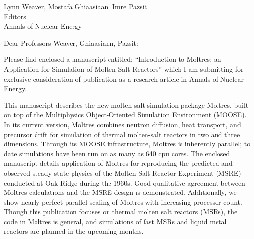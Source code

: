 \documentclass[10pt]{letter} %
\begin{document}

\begin{letter}{Lynn Weaver, Mostafa Ghiaasiaan, Imre Pazsit\\
Editors\\
Annals of Nuclear Energy}


\address{Department of Nuclear, Plasma, and Radiological Engineering\\
Talbot Hall, Room 226\\
104 S Wright St\\
University of Illinois, Urbana-Champaign\\
Urbana, IL 61801}



\opening{Dear Professors Weaver, Ghiaasiann, Pazsit:}

Please find enclosed a manuscript entitled: ``Introduction to Moltres: an
Application for Simulation of Molten Salt Reactors'' which I am submitting for
exclusive consideration of publication as a research article in Annals of
Nuclear Energy.

This manuscript describes the new molten salt simulation package Moltres, built
on top of the Multiphysics Object-Oriented Simulation Environment (MOOSE). In
its current version, Moltres combines neutron diffusion, heat transport, and
precursor drift for simulation of thermal molten-salt reactors in two and three
dimensions. Through its MOOSE infrastructure, Moltres is inherently parallel; to
date simulations have been run on as many as 640 cpu cores. The enclosed
manuscript details application of Moltres for reproducing the predicted and
observed steady-state physics of the Molten Salt Reactor Experiment (MSRE)
conducted at Oak Ridge during the 1960s. Good qualitative agreement between
Moltres calculations and the MSRE design is demonstrated. Additionally, we show
nearly perfect parallel scaling of Moltres with increasing processor
count. Though this publication focuses on thermal molten salt reactors (MSRs), the code
in Moltres is general, and simulations of fast MSRs and liquid metal reactors
are planned in the upcoming months. 


\end{letter}
\end{document}
